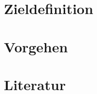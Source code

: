 \documentclass[11pt,headsepline,a4paper,bibtotoc,liststotoc,DIV12,BCOR12mm]{scrartcl}
\begin{document}

\section{Zieldefinition} %
\label{sec:zieldefinition}


\section{Vorgehen} %
\label{sec:vorgehen}


\section{Literatur} %
\label{sec:literatur}


% 
% 
% 

\end{document}
